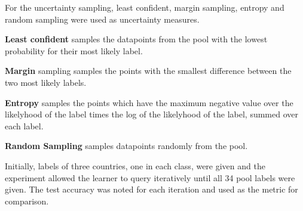 \documentclass[fleqn]{article}
\begin{document}
\begin{multicols}{2}
	For the uncertainty sampling, least confident, margin sampling, entropy and random sampling were used as uncertainty measures.
	

	\begin{compactitem}
		\item \textbf{Least confident} samples the datapoints from the pool with the lowest probability for their most likely label.
		\item \textbf{Margin} sampling samples the points with the smallest difference between the two most likely labels.
		\item \textbf{Entropy} samples the points which have the maximum negative value over the likelyhood of the label times the log of the likelyhood of the label, summed over each label.
		\item \textbf{Random Sampling} samples datapoints randomly from the pool.
	\end{compactitem}
		Initially, labels of three countries, one in each class, were given and the experiment allowed the learner to query iteratively until all 34 pool labels were given. The test accuracy was noted for each iteration and used as the metric for comparison.
\end{multicols}		
\end{document}
